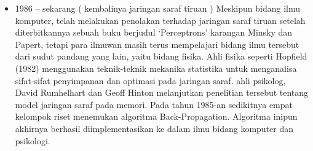 \begin{enumerate}
\begin{itemize}
    \item 1986 – sekarang ( kembalinya jaringan saraf tiruan )
    Meskipun bidang ilmu komputer, telah melakukan penolakan terhadap jaringan saraf tiruan setelah diterbitkannya sebuah buku berjudul ‘Perceptrons’ karangan Minsky dan Papert, tetapi para ilmuwan masih terus mempelajari bidang ilmu tersebut dari sudut pandang yang lain, yaitu bidang fisika. Ahli fisika seperti Hopfield (1982) menggunakan teknik-teknik mekanika statistika untuk menganalisa sifat-sifat penyimpanan dan optimasi pada jaringan saraf. ahli psikolog, David Rumhelhart dan Geoff Hinton melanjutkan penelitian tersebut tentang model jaringan saraf pada memori. Pada tahun 1985-an sedikitnya empat kelompok riset menemukan algoritma Back-Propagation. Algoritma inipun akhirnya berhasil diimplementasikan ke dalam ilmu bidang komputer dan psikologi.
	\end{itemize}		
\end{enumerate}

